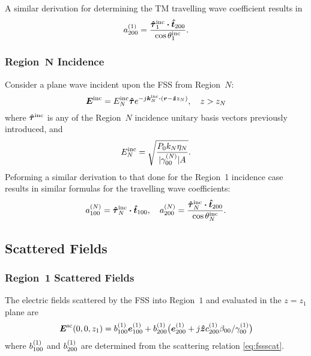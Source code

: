 A similar derivation for determining the TM travelling wave coefficient results in
\begin{equation}
  a\one_{200} = \frac{\tauhat_1\inc \bdot \t_{200}}{\cos\theta_1\inc}.
\end{equation}

\subsubsection[Region \textit{N} Incidence]{Region~$\boldsymbol{N}$ Incidence}

Consider a plane wave incident upon the FSS from Region~$N$:
\begin{equation}
  \E\inc = E_N\inc \tauhat e^{-j\k_N\inc \bdot (\r - \z z_N)}, \quad z > z_N
  \label{eq:EincN}
\end{equation}
where $\tauhat\inc$ is any of the Region~$N$ incidence unitary basis vectors previously introduced, and
\begin{equation}
  \label{eq:E0incN}
  E_N^{\text{inc}} = \sqrt{\frac{P_0 k_N\eta_N}{\lvert\gamma_{00}^{(N)}\rvert A}}.
\end{equation}
Peforming a similar derivation to that done for the Region~1 incidence case results in similar formulas for the
travelling wave coefficients:
\begin{equation}
  a\enn_{100} = \tauhat_N\inc \bdot \t_{100}, \quad
  a\enn_{200} = \frac{\tauhat_N\inc \bdot \t_{200}}{\cos\theta_N\inc}.
\end{equation}

\subsection{Scattered Fields}
\subsubsection{Region~1 Scattered Fields}

The electric fields scattered by the FSS into Region~$1$ and evaluated in the $z=z_1$ plane are
\begin{equation}
  \boldsymbol{E}^{\text{sc}}(0,0,z_1) =  b^{(1)}_{100} \boldsymbol{e}^{(1)}_{100} + b^{(1)}_{200} \bigl(\boldsymbol{e}^{(1)}_{200} +
  j \boldsymbol{\hat{z}} c_{200}^{(1)} \beta_{00} / \gamma_{00}^{(1)}  \bigr)
   \label{eq:escat11}
\end{equation}
where $b^{(1)}_{100}$ and $b^{(1)}_{200}$ are determined from the
scattering relation \eqref{eq:fssscat}.  

